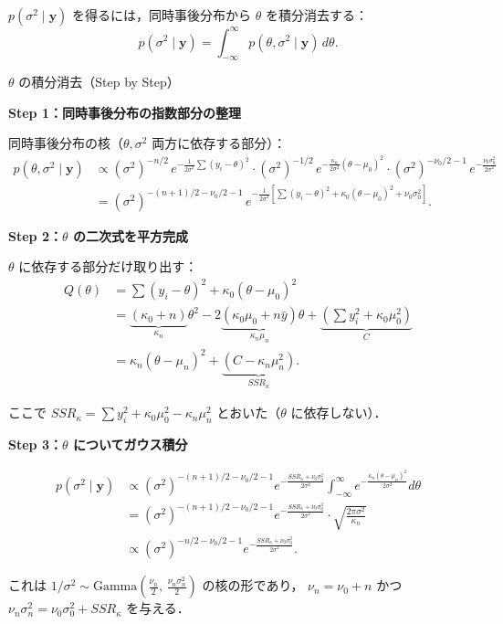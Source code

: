 \documentclass[lualatex,ja=standard,a4paper,12pt]{bxjsarticle}
\begin{document}
$p(\sigma^2 \mid \mathbf{y})$ を得るには，同時事後分布から $\theta$ を積分消去する：
\[
  p(\sigma^2 \mid \mathbf{y})
  = \int_{-\infty}^{\infty} p(\theta, \sigma^2 \mid \mathbf{y})\, d\theta.
\]

\begin{derivbox}{$\theta$ の積分消去（Step by Step）}

\noindent\textbf{Step 1：同時事後分布の指数部分の整理}

\vspace{4pt}
同時事後分布の核（$\theta, \sigma^2$ 両方に依存する部分）：
\begin{align*}
  p(\theta, \sigma^2 \mid \mathbf{y})
  &\propto (\sigma^2)^{-n/2}\,
    e^{-\frac{1}{2\sigma^2}\sum(y_i-\theta)^2}
    \cdot (\sigma^2)^{-1/2}\,
    e^{-\frac{\kappa_0}{2\sigma^2}(\theta-\mu_0)^2}
    \cdot (\sigma^2)^{-\nu_0/2-1}\,
    e^{-\frac{\nu_0\sigma_0^2}{2\sigma^2}} \\[4pt]
  &= (\sigma^2)^{-(n+1)/2-\nu_0/2-1}\,
     e^{-\frac{1}{2\sigma^2}\left[\sum(y_i-\theta)^2 + \kappa_0(\theta-\mu_0)^2 + \nu_0\sigma_0^2\right]}.
\end{align*}

\noindent\textbf{Step 2：$\theta$ の二次式を平方完成}

\vspace{4pt}
$\theta$ に依存する部分だけ取り出す：
\begin{align*}
  Q(\theta)
  &= \sum(y_i-\theta)^2 + \kappa_0(\theta-\mu_0)^2 \\
  &= \underbrace{(\kappa_0 + n)}_{\kappa_n}\theta^2
     - 2\underbrace{(\kappa_0\mu_0 + n\bar{y})}_{\kappa_n\mu_n}\theta
     + \underbrace{\left(\sum y_i^2 + \kappa_0\mu_0^2\right)}_{C} \\
  &= \kappa_n(\theta - \mu_n)^2 + \underbrace{\left(C - \kappa_n\mu_n^2\right)}_{SSR_\kappa}.
\end{align*}

ここで $SSR_\kappa = \sum y_i^2 + \kappa_0\mu_0^2 - \kappa_n\mu_n^2$ とおいた（$\theta$ に依存しない）．

\noindent\textbf{Step 3：$\theta$ についてガウス積分}

\vspace{4pt}
\begin{align*}
  p(\sigma^2 \mid \mathbf{y})
  &\propto (\sigma^2)^{-(n+1)/2-\nu_0/2-1}
     e^{-\frac{SSR_\kappa + \nu_0\sigma_0^2}{2\sigma^2}}
     \int_{-\infty}^{\infty}
       e^{-\frac{\kappa_n(\theta-\mu_n)^2}{2\sigma^2}} d\theta \\[4pt]
  &= (\sigma^2)^{-(n+1)/2-\nu_0/2-1}
     e^{-\frac{SSR_\kappa + \nu_0\sigma_0^2}{2\sigma^2}}
     \cdot \sqrt{\frac{2\pi\sigma^2}{\kappa_n}} \\[4pt]
  &\propto (\sigma^2)^{-n/2-\nu_0/2-1}
     e^{-\frac{SSR_\kappa + \nu_0\sigma_0^2}{2\sigma^2}}.
\end{align*}

これは $1/\sigma^2 \sim \mathrm{Gamma}\!\left(\frac{\nu_n}{2},\, \frac{\nu_n\sigma_n^2}{2}\right)$ の核の形であり，
$\nu_n = \nu_0 + n$ かつ $\nu_n\sigma_n^2 = \nu_0\sigma_0^2 + SSR_\kappa$
を与える．
\end{derivbox}
\end{document}
